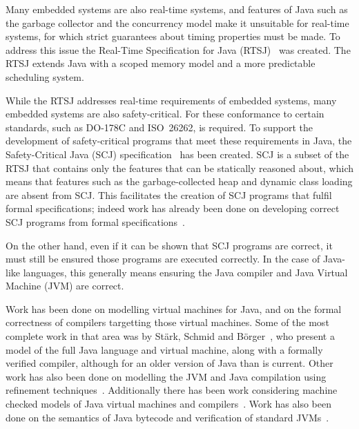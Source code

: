 \documentclass[a4paper,10pt]{report}
\begin{document}
Many embedded systems are also real-time systems, and features of Java such as
the garbage collector and the concurrency model make it unsuitable for real-time
systems, for which strict guarantees about timing properties must be made.  To
address this issue the Real-Time Specification for Java
(RTSJ)~\cite{gosling2000} was created.  The RTSJ extends Java with a scoped
memory model and a more predictable scheduling system.

While the RTSJ addresses real-time requirements of embedded systems, many
embedded systems are also safety-critical.  For these conformance to certain
standards, such as \mbox{DO-178C} and ISO~26262, is required.  To support the
development of safety-critical programs that meet these requirements in Java,
the Safety-Critical Java (SCJ) specification~\cite{locke2013} has been created.
SCJ is a subset of the RTSJ that contains only the features that can be
statically reasoned about, %
which means that features such as the
garbage-collected heap and dynamic class loading are absent from SCJ.  This
facilitates the creation of SCJ programs that fulfil formal specifications;
indeed work has already been done on developing correct SCJ programs from formal
specifications~\cite{cavalcanti2011, cavalcanti2013}.

On the other hand, even if it can be shown that SCJ programs are correct, it
must still be ensured those programs are executed correctly.  In the case of
Java-like languages, this generally means ensuring the Java compiler and Java
Virtual Machine (JVM) are correct.

Work has been done on modelling virtual machines for Java, and on the formal
correctness of compilers targetting those virtual machines.  Some of the most
complete work in that area was by St\"{a}rk, Schmid and
B\"{o}rger~\cite{stark2001}, who present a model of the full Java language and
virtual machine, along with a formally verified compiler, although for an older
version of Java than is current.  Other work has also been done on modelling the
JVM and Java compilation using refinement
techniques~\cite{duran2010}. Additionally there has been work considering
machine checked models of Java virtual machines and
compilers~\cite{lochbihler2012, nipkow2000, strecker2002}. Work has also been
done on the semantics of Java bytecode and verification of standard
JVMs~\cite{bertelsen2000, jones1998}.
\end{document}
